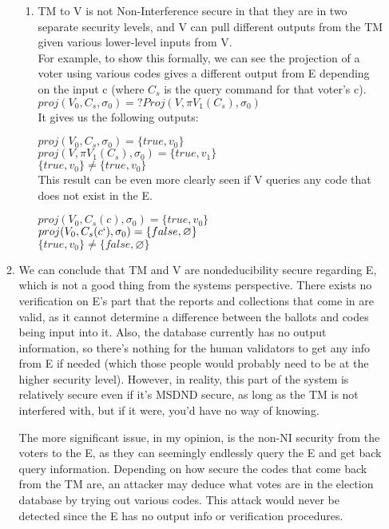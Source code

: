 \documentclass[journal,onecolumn]{IEEEtran}
\begin{document}
\begin{enumerate}
\begin{enumerate}
\begin{enumerate}
        \item TM to V is not Non-Interference secure in that they are in two separate security levels, and V can pull different outputs from the TM given various lower-level inputs from V.\\
        
        For example, to show this formally, we can see the projection of a voter using various codes gives a different output from E depending on the input c (where $C_s$ is the query command for that voter's c). \\

        $proj(V_0, C_s, \sigma_0) =? Proj(V, \pi V_1(C_s), \sigma_0)$ \\

        It gives us the following outputs:

        $proj(V_0, C_s, \sigma_0) = \{true, v_0\}$ \\
        $proj(V, \pi V_1 (C_s), \sigma_0) = \{true, v_1\}$ \\
        $\{true, v_0\} \neq \{true, v_0\}$ \\

        This result can be even more clearly seen if V queries any code that does not exist in the E. 

        $proj(V_0, C_s(c), \sigma_0) = \{true, v_0\}$ \\
        $proj(V_0, C_s(c`), \sigma_0) = \{false, \varnothing\}$ \\
        $\{true, v_0\} \neq \{false, \varnothing\}$ \\
        
      \end{enumerate}

      \item We can conclude that TM and V are nondeducibility secure regarding E, which is not a good thing from the systems perspective. There exists no verification on E's part that the reports and collections that come in are valid, as it cannot determine a difference between the ballots and codes being input into it. Also, the database currently has no output information, so there's nothing for the human validators to get any info from E if needed (which those people would probably need to be at the higher security level). However, in reality, this part of the system is relatively secure even if it's MSDND secure, as long as the TM is not interfered with, but if it were, you'd have no way of knowing. 
      
      The more significant issue, in my opinion, is the non-NI security from the voters to the E, as they can seemingly endlessly query the E and get back query information. Depending on how secure the codes that come back from the TM are, an attacker may deduce what votes are in the election database by trying out various codes. This attack would never be detected since the E has no output info or verification procedures. 


\end{enumerate}
\end{enumerate}
\end{document}
